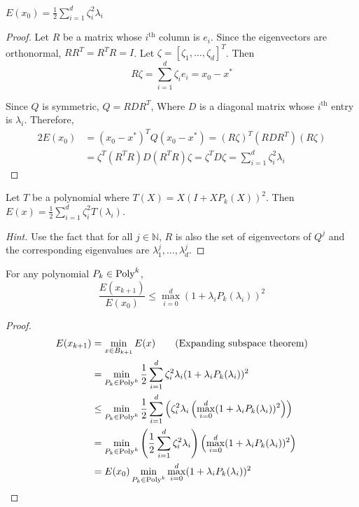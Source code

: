 \begin{lemma}
$E(x_0) = \frac{1}{2} \sum_{i=1}^d \zeta_i^2 \lambda_i$
\end{lemma}
\begin{proof}
Let $R$ be a matrix whose $i^{\textrm{th}}$ column is $e_i$.
Since the eigenvectors are orthonormal, $RR^T = R^TR = I$.
Let $\zeta = [\zeta_1, \ldots, \zeta_d]^T$. Then
\[ R\zeta = \sum_{i=1}^d \zeta_i e_i = x_0 - x^* \]

Since $Q$ is symmetric, $Q = RDR^T$,
Where $D$ is a diagonal matrix whose $i^{\textrm{th}}$ entry is $\lambda_i$.
Therefore,
\begin{align*}
2E(x_0) &= (x_0 - x^*)^T Q (x_0 - x^*) = (R\zeta)^T(RDR^T)(R\zeta)
\\ &= \zeta^T (R^TR) D (R^TR) \zeta = \zeta^T D \zeta = \sum_{i=1}^d \zeta_i^2 \lambda_i
\end{align*}
\end{proof}

\begin{lemma}[Homework]
Let $T$ be a polynomial where $T(X) = X(I + XP_k(X))^2$. Then
$E(x) = \frac{1}{2} \sum_{i=1}^d \zeta_i^2 T(\lambda_i)$.
\end{lemma}
\begin{proof}[Hint]
Use the fact that for all $j \in \mathbb{N}$,
$R$ is also the set of eigenvectors of $Q^j$
and the corresponding eigenvalues are $\lambda_1^j, \ldots, \lambda_d^j$.
\end{proof}

\begin{lemma}
For any polynomial $P_k \in \textrm{Poly}^{k}$,
\[ \frac{E(x_{k+1})}{E(x_0)} \le \max_{i=0}^d (1 + \lambda_i P_k(\lambda_i))^2 \]
\end{lemma}
\begin{proof}
\begin{align*}
E(x_{k+1}) &= \min_{x \in B_{k+1}} E(x)  \tag{Expanding subspace theorem}
\\ &= \min_{P_k \in \textrm{Poly}^{k}} \frac{1}{2} \sum_{i=1}^d \zeta_i^2 \lambda_i(1 + \lambda_iP_k(\lambda_i))^2
\\ &\le \min_{P_k \in \textrm{Poly}^{k}} \frac{1}{2} \sum_{i=1}^d \left(\zeta_i^2 \lambda_i
    \left(\max_{i=0}^d (1 + \lambda_i P_k(\lambda_i))^2\right)\right)
\\ &= \min_{P_k \in \textrm{Poly}^{k}} \left( \frac{1}{2} \sum_{i=1}^d \zeta_i^2 \lambda_i \right)
    \left(\max_{i=0}^d (1 + \lambda_i P_k(\lambda_i))^2\right)
\\ &= E(x_0) \min_{P_k \in \textrm{Poly}^{k}} \max_{i=0}^d (1 + \lambda_i P_k(\lambda_i))^2
\end{align*}
\end{proof}


